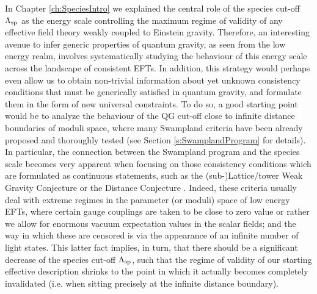 In Chapter \ref{ch:SpeciesIntro} we explained the central role of the species cut-off $\Lambda_{\text{sp}}$ as the energy scale controlling the maximum regime of validity of any effective field theory weakly coupled to Einstein gravity. Therefore, an interesting avenue to infer generic properties of quantum gravity, as seen from the low energy realm, involves systematically studying the behaviour of this energy scale across the landscape of consistent EFTs. In addition, this strategy would perhaps even allow us to obtain non-trivial information about yet unknown consistency conditions that must be generically satisfied in quantum gravity, and formulate them in the form of new universal constraints. To do so, a good starting point would be to analyze the behaviour of the QG cut-off close to infinite distance boundaries of moduli space, where many Swampland criteria have been already proposed and thoroughly tested (see Section \ref{s:SwamplandProgram} for details). In particular, the connection between the Swampland program and the species scale becomes very apparent when focusing on those consistency conditions which are formulated as continuous statements, such as the (sub-)Lattice/tower Weak Gravity Conjecture \cite{Heidenreich:2015nta,Heidenreich:2016aqi,Montero:2016tif,Andriolo:2018lvp} or the Distance Conjecture \cite{Ooguri:2006in, Etheredge:2022opl}. Indeed, these criteria usually deal with extreme regimes in the parameter (or moduli) space of low energy EFTs, where certain gauge couplings are taken to be close to zero value or rather we allow for enormous vacuum expectation values in the scalar fields; and the way in which these are censored is via the appearance of an infinite number of light states. This latter fact implies, in turn, that there should be a significant decrease of the species cut-off $\Lambda_{\text{sp}}$, such that the regime of validity of our starting effective description shrinks to the point in which it actually becomes completely invalidated (i.e. when sitting precisely at the infinite distance boundary).

